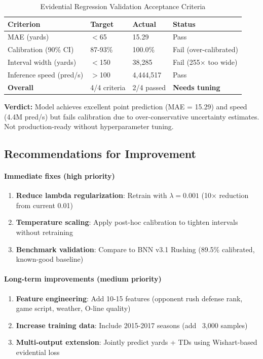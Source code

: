 \begin{table}[htbp]
\centering
\caption{Evidential Regression Validation Acceptance Criteria}
\label{tab:evidential_acceptance_criteria}
\begin{tabular}{llll}
\toprule
\textbf{Criterion} & \textbf{Target} & \textbf{Actual} & \textbf{Status} \\
\midrule
MAE (yards) & $<$65 & 15.29 & Pass \\
Calibration (90\% CI) & 87-93\% & 100.0\% & Fail (over-calibrated) \\
Interval width (yards) & $<$150 & 38,285 & Fail (255$\times$ too wide) \\
Inference speed (pred/s) & $>$100 & 4,444,517 & Pass \\
\midrule
\textbf{Overall} & 4/4 criteria & 2/4 passed & \textbf{Needs tuning} \\
\bottomrule
\end{tabular}
\end{table}

\noindent \textbf{Verdict:} Model achieves excellent point prediction (MAE = 15.29) and speed (4.4M pred/s) but fails calibration due to over-conservative uncertainty estimates. Not production-ready without hyperparameter tuning.

\subsection{Recommendations for Improvement}

\paragraph{Immediate fixes (high priority)}
\begin{enumerate}[nosep]
    \item \textbf{Reduce lambda regularization}: Retrain with $\lambda=0.001$ (10× reduction from current 0.01)
    \item \textbf{Temperature scaling}: Apply post-hoc calibration to tighten intervals without retraining
    \item \textbf{Benchmark validation}: Compare to BNN v3.1 Rushing (89.5\% calibrated, known-good baseline)
\end{enumerate}

\paragraph{Long-term improvements (medium priority)}
\begin{enumerate}[nosep]
    \item \textbf{Feature engineering}: Add 10-15 features (opponent rush defense rank, game script, weather, O-line quality)
    \item \textbf{Increase training data}: Include 2015-2017 seasons (add ~3,000 samples)
    \item \textbf{Multi-output extension}: Jointly predict yards + TDs using Wishart-based evidential loss
\end{enumerate}

